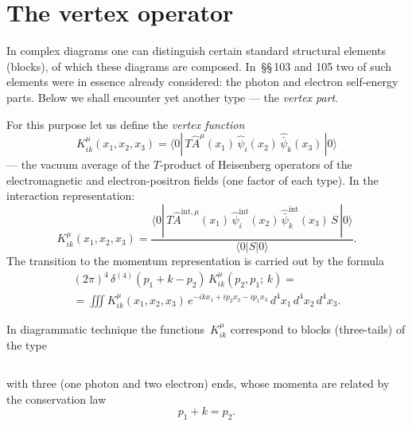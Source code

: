 
\section{The vertex operator}


In complex diagrams one can distinguish certain standard structural elements (blocks), of which these diagrams are composed. In~\S\S\,103 and 105 two of such elements were in essence already considered: the photon and electron self-energy parts. Below we shall encounter yet another type --- the \emph{vertex part}.


For this purpose let us define the \emph{vertex function}
\begin{equation}
K^\mu_{ik}(x_1, x_2, x_3) = \langle 0|\,T\hat{A}^\mu(x_1)\,\hat{\psi}_i(x_2)\,\hat{\bar{\psi}}_k(x_3)\,|0\rangle
\label{eq:106.1}
\end{equation}
--- the vacuum average of the $T$-product of Heisenberg operators of the electromagnetic and electron-positron fields (one factor of each type). In the interaction representation:
\begin{equation}
K^\mu_{ik}(x_1, x_2, x_3) = \frac{\langle 0|\,T\hat{A}^{\mathrm{int},\mu}(x_1)\,\hat{\psi}^{\mathrm{int}}_i(x_2)\,\hat{\bar{\psi}}^{\mathrm{int}}_k(x_3)\,S\,|0\rangle}{\langle 0|S|0\rangle}.
\label{eq:106.2}
\end{equation}
The transition to the momentum representation is carried out by the formula
\begin{multline}
(2\pi)^4\,\delta^{(4)}(p_1 + k - p_2)\,K^\mu_{ik}(p_2, p_1;\, k) = {} \\
= \iiint K^\mu_{ik}(x_1, x_2, x_3)\,e^{-ikx_1 + ip_2 x_2 - ip_1 x_3}\,d^4x_1\,d^4x_2\,d^4x_3.
\label{eq:106.3}
\end{multline}

In diagrammatic technique the functions~$K^\mu_{ik}$ correspond to blocks (three-tails) of the type

\begin{equation}
\label{eq:106.4}
\end{equation}

\noindent with three (one photon and two electron) ends, whose momenta are related by the conservation law
\begin{equation}
p_1 + k = p_2.
\label{eq:106.5}
\end{equation}

